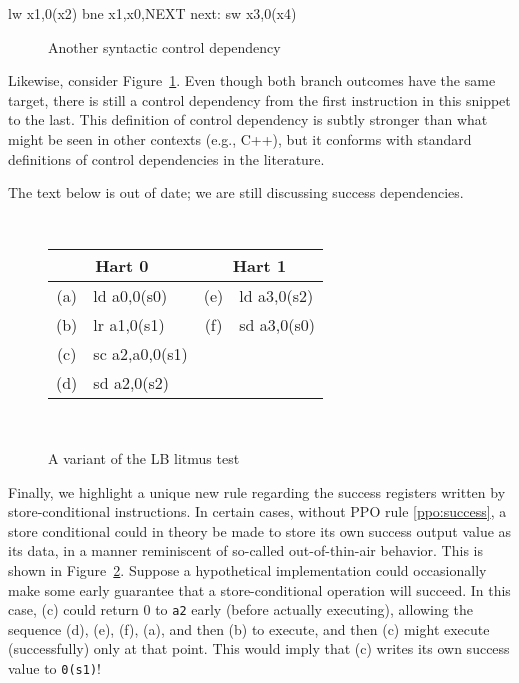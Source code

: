 \begin{verbbox}
        lw  x1,0(x2)
        bne x1,x0,NEXT
  next: sw  x3,0(x4)
\end{verbbox}
\begin{figure}[h!]
  \centering\small
  \theverbbox
  \caption{Another syntactic control dependency}
  \label{fig:litmus:control2}
\end{figure}

Likewise, consider Figure~\ref{fig:litmus:control2}.
Even though both branch outcomes have the same target, there is still a control dependency from the first instruction in this snippet to the last.
This definition of control dependency is subtly stronger than what might be seen in other contexts (e.g., C++), but it conforms with standard definitions of control dependencies in the literature.

\begin{tentative}
  The text below is out of date; we are still discussing success dependencies.
\end{tentative}
\begin{figure}[h!]
  \center
  {
    \tt\small
    \begin{tabular}{cl||cl}
    \multicolumn{2}{c}{Hart 0} & \multicolumn{2}{c}{Hart 1} \\
    \hline
      (a) & ld a0,0(s0)    & (e) & ld a3,0(s2) \\
      (b) & lr a1,0(s1)    & (f) & sd a3,0(s0) \\
      (c) & sc a2,a0,0(s1) &                    \\
      (d) & sd a2,0(s2)    &                    \\
    \end{tabular}
  }
  ~~~~
  \diagram
  \caption{A variant of the LB litmus test}
  \label{fig:litmus:successdeps}
\end{figure}

Finally, we highlight a unique new rule regarding the success registers written by store-conditional instructions.
In certain cases, without PPO rule \ref{ppo:success}, a store conditional could in theory be made to store its own success output value as its data, in a manner reminiscent of so-called out-of-thin-air behavior.
This is shown in Figure~\ref{fig:litmus:successdeps}.
Suppose a hypothetical implementation could occasionally make some early guarantee that a store-conditional operation will succeed.
In this case, (c) could return 0 to {\tt a2} early (before actually executing), allowing the sequence (d), (e), (f), (a), and then (b) to execute, and then (c) might execute (successfully) only at that point.
This would imply that (c) writes its own success value to {\tt 0(s1)}!

